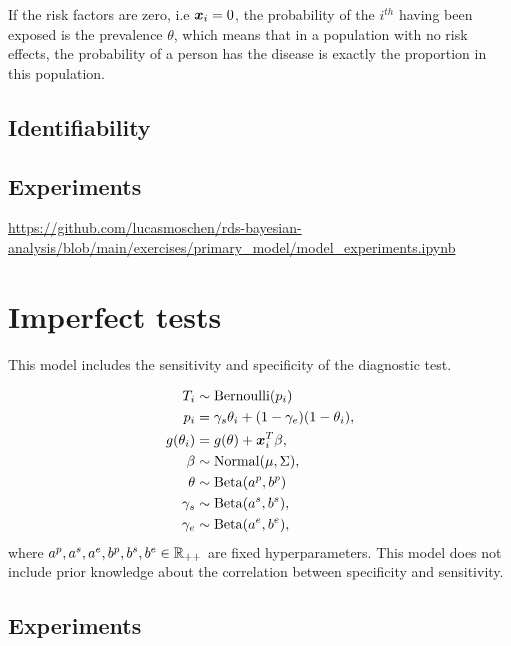 \begin{remark}
  If the risk factors are zero, i.e $\boldsymbol{x}_i = 0$, the probability of the
  $i^{th}$ having been exposed is the prevalence $\theta$, which means that in
  a population with no risk effects, the probability of a person has the
  disease is exactly the proportion in this population. 
\end{remark}

\subsection{Identifiability}

\subsection{Experiments}

\url{https://github.com/lucasmoschen/rds-bayesian-analysis/blob/main/exercises/primary_model/model_experiments.ipynb}

\section{Imperfect tests}

This model includes the sensitivity and specificity of the diagnostic test. 

\begin{equation}
  \begin{aligned}
    T_i &\sim \operatorname{Bernoulli}(p_i) \\
    p_i &= \gamma_s\theta_i + (1-\gamma_e)(1 - \theta_i),  \\
    g(\theta_i) &= g(\theta) + \boldsymbol{x}_i^T\beta,  \\
    \beta &\sim \operatorname{Normal}(\mu, \Sigma), \\ 
    \theta &\sim \operatorname{Beta}(a^p, b^p) \\
    \gamma_s &\sim \operatorname{Beta}(a^s, b^s), \\
    \gamma_e &\sim \operatorname{Beta}(a^e, b^e), \\    
  \end{aligned}  
\end{equation}
where $a^p, a^s, a^e, b^p, b^s, b^e \in \mathbb{R}_{++}$ are fixed hyperparameters.
This model does not include prior knowledge about the correlation between
specificity and sensitivity. 

\subsection{Experiments}

